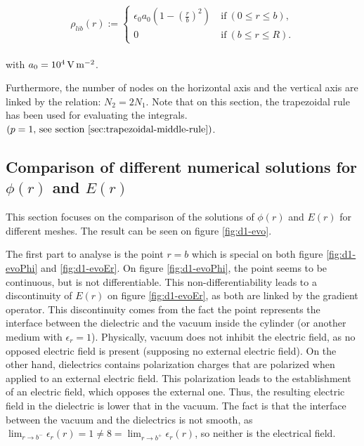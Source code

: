 \documentclass[a4paper,12pt,twoside]{article}
\newcommand{\bracket}[1]{\left(#1\right)}
\begin{document}
  \begin{align}
    \begin{split}
      \rho_{lib}\bracket{r} := \begin{cases}
        \epsilon_0 a_0\bracket{1-\bracket{\frac{r}{b}}^2}~&\text{if}~\bracket{0\leq r\leq b},\\
        0~&\text{if}~\bracket{b\leq r\leq R}.
      \end{cases}
    \end{split}
    \label{eq:def-rholib}
  \end{align}

  with $a_0=\SI{d4}{\volt\per\square\meter}$.

  Furthermore, the number of nodes on the horizontal axis and the vertical axis are linked by the relation: $N_2 = 2N_1$.
  Note that on this section, the trapezoidal rule has been used for evaluating the integrals. $\bracket{p=1\text{, see section \ref{sec:trapezoidal-middle-rule}}}$.


  \subsection{Comparison of different numerical solutions for $\phi\bracket{r}$ and $E\bracket{r}$}
  This section focuses on the comparison of the solutions of $\phi\bracket{r}$ and $E\bracket{r}$ for different meshes.
  The result can be seen on figure \ref{fig:d1-evo}.

  The first part to analyse is the point $r=b$ which is special on both figure \ref{fig:d1-evoPhi} and \ref{fig:d1-evoEr}.
  On figure \ref{fig:d1-evoPhi}, the point seems to be continuous, but is not differentiable.
  This non-differentiability leads to a discontinuity of $E\bracket{r}$ on figure \ref{fig:d1-evoEr}, as both are linked by the gradient operator.
  This discontinuity comes from the fact the point represents the interface between the dielectric and the vacuum inside the cylinder (or another medium with $\epsilon_r=1$).
  Physically, vacuum does not inhibit the electric field, as no opposed electric field is present (supposing no external electric field).
  On the other hand, dielectrics contains polarization charges that are polarized when applied to an external electric field. \cite{wiki:dielectrics}
  This polarization leads to the establishment of an electric field, which opposes the external one.
  Thus, the resulting electric field in the dielectric is lower that in the vacuum.
  The fact is that the interface between the vacuum and the dielectrics is not smooth, as $\lim_{r\rightarrow b^-}\epsilon_r\bracket{r} = 1 \neq 8 = \lim_{r\rightarrow b^+}\epsilon_r\bracket{r}$, so neither is the electrical field.\\
\end{document}
